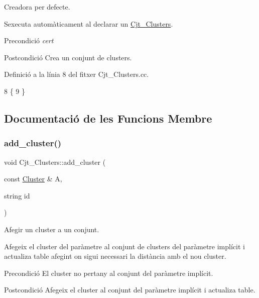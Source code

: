 Creadora per defecte. 

S\textquotesingle{}executa automàticament al declarar un \hyperlink{class_cjt___clusters}{Cjt\+\_\+\+Clusters}.

\begin{DoxyPrecond}{Precondició}
{\itshape cert} 
\end{DoxyPrecond}
\begin{DoxyPostcond}{Postcondició}
Crea un conjunt de clusters. 
\end{DoxyPostcond}


Definició a la línia 8 del fitxer Cjt\+\_\+\+Clusters.\+cc.


\begin{DoxyCode}
8                            \{
9 \}
\end{DoxyCode}


\subsection{Documentació de les Funcions Membre}
\mbox{\label{class_cjt___clusters_ace64164c455de6b3e91b774ad95d93ac}} 
\subsubsection{\texorpdfstring{add\+\_\+cluster()}{add\_cluster()}}
{\footnotesize\ttfamily void Cjt\+\_\+\+Clusters\+::add\+\_\+cluster (\begin{DoxyParamCaption}\item[{const \hyperlink{class_cluster}{Cluster} \&}]{A,  }\item[{string}]{id }\end{DoxyParamCaption})}



Afegir un cluster a un conjunt. 

Afegeix el cluster del paràmetre al conjunt de clusters del paràmetre implícit i actualiza table afegint on sigui necessari la distància amb el nou cluster.

\begin{DoxyPrecond}{Precondició}
El cluster no pertany al conjunt del paràmetre implícit. 
\end{DoxyPrecond}
\begin{DoxyPostcond}{Postcondició}
Afegeix el cluster al conjunt del paràmetre implícit i actualiza table. 
\end{DoxyPostcond}


